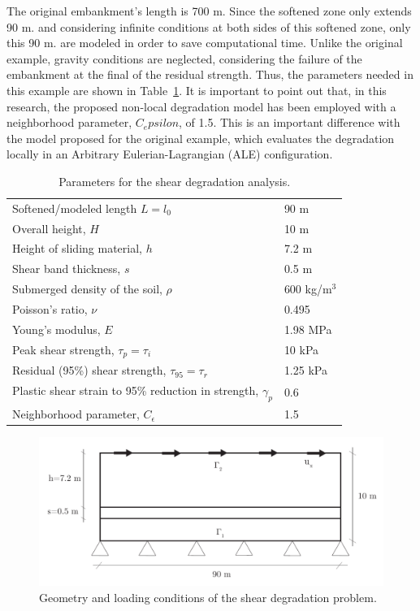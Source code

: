 \documentclass[applsci,journal,article,submit,moreauthors,pdftex]{Definitions/mdpi}
\begin{document}
The original embankment's length is 700 m. Since the softened zone only extends 90 m. and considering infinite conditions at both sides of this softened zone, only this 90 m. are modeled in order to save computational time. Unlike the original example, gravity conditions are neglected, considering the failure of the embankment at the final  of the residual strength. Thus, the parameters needed in this example are shown in Table~\ref{tab2}. It is important to point out that, in this research, the proposed non-local degradation model has been employed with a neighborhood parameter, $C_epsilon$, of 1.5. This is an important difference with the model proposed for the original example, which evaluates the degradation locally in an Arbitrary Eulerian-Lagrangian (ALE) configuration.

\begin{table}
\caption{\label{tab2} Parameters for the shear degradation analysis.} 
\centering
	\begin{tabular}{ll}
	 Softened/modeled length $L=l_0$ & 	 90 m \\
	 Overall height, $H$ & 10 m \\
	 Height of sliding material, $h$ & 7.2 m \\
	 Shear band thickness, $s$ & 0.5 m \\
	 Submerged density of the soil, $\rho$ & 600 kg/m$^3$ \\
	 Poisson's ratio, $\nu$ & 0.495 \\
	 Young's modulus, $E$ & 1.98 MPa \\
	 Peak shear strength, $\tau_p=\tau_i$ & 10 kPa \\
	 Residual (95\%) shear strength, $\tau_{95}=\tau_r$ & 1.25 kPa \\
	 Plastic shear strain to 95\% reduction in strength, $\gamma_p$ & 0.6 \\
	 Neighborhood parameter, $C_\epsilon$ & 1.5
	\end{tabular}
\end{table}

\begin{figure}[!t]
\begin{center}
\includegraphics[width=12cm]{Figs/geo_shear.pdf}
\caption{Geometry and loading conditions of the shear degradation problem.}
\label{fig_geoshear}
\end{center}
\end{figure}
\end{document}
